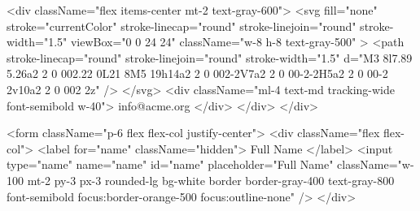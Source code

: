 {                                                <div className="flex items-center mt-2 text-gray-600">
                                                    <svg
                                                        fill="none"
                                                        stroke="currentColor"
                                                        stroke-linecap="round"
                                                        stroke-linejoin="round"
                                                        stroke-width="1.5"
                                                        viewBox="0 0 24 24"
                                                        className="w-8 h-8 text-gray-500"
                                                    >
                                                        <path
                                                            stroke-linecap="round"
                                                            stroke-linejoin="round"
                                                            stroke-width="1.5"
                                                            d="M3 8l7.89 5.26a2 2 0 002.22 0L21 8M5 19h14a2 2 0 002-2V7a2 2 0 00-2-2H5a2 2 0 00-2 2v10a2 2 0 002 2z"
                                                        />
                                                    </svg>
                                                    <div className="ml-4 text-md tracking-wide font-semibold w-40">
                                                        info@acme.org
                                                    </div>
                                                </div>
                                            </div>
                    
                                            <form className="p-6 flex flex-col justify-center">
                                                <div className="flex flex-col">
                                                    <label for="name" className="hidden">
                                                        Full Name
                                                    </label>
                                                    <input
                                                        type="name"
                                                        name="name"
                                                        id="name"
                                                        placeholder="Full Name"
                                                        className="w-100 mt-2 py-3 px-3 rounded-lg bg-white border border-gray-400 text-gray-800 font-semibold focus:border-orange-500 focus:outline-none"
                                                    />
                                                </div>
                    
}
